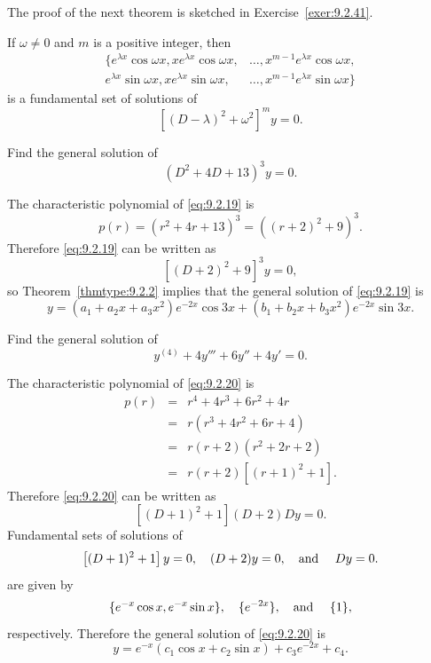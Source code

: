 The proof of the next theorem is sketched in Exercise~\ref{exer:9.2.41}.

\begin{theorem}
  \color{blue}
  \label{thmtype:9.2.2} If $\omega\ne0$ and $m$ is a positive integer, then
  \[
    \begin{array}{rl}
      \{e^{\lambda x}\cos\omega x,xe^{\lambda x}\cos\omega x, & \dots,x^{m-1}e^{\lambda x}\cos\omega x,  \\
      e^{\lambda x}\sin\omega x,xe^{\lambda x}\sin\omega x,   & \dots,x^{m-1}e^{\lambda x}\sin\omega x\}
    \end{array}
  \]
  is a fundamental set of solutions of
  \[
    [(D-\lambda)^{2}+\omega^{2}]^{m}y=0.
  \]
\end{theorem}

\begin{example}
  \label{example:9.2.6} \rm Find the general solution of
  \begin{equation}
    \label{eq:9.2.19}(D^{2}+4D+13)^{3}y=0.
  \end{equation}
\end{example}

\begin{examplesolution}
\solution The characteristic polynomial of \eqref{eq:9.2.19} is
\[
  p(r)=(r^{2}+4r+13)^{3}=\left((r+2)^{2}+9\right)^{3}.
\]
Therefore \eqref{eq:9.2.19} can be written as
\[
  [(D+2)^{2}+9]^{3}y=0,
\]
so Theorem~\ref{thmtype:9.2.2} implies that the general solution of \eqref{eq:9.2.19} is
\[
  y=(a_{1}+a_{2}x+a_{3}x^{2})e^{-2x}\cos3x +(b_{1}+b_{2}x+b_{3}x^{2})e^{-2x}\sin3x.
\]
\end{examplesolution}

\begin{example}
  \label{example:9.2.7} \rm Find the general solution of
  \begin{equation}
    \label{eq:9.2.20}y^{(4)}+4y'''+6y''+4y'=0.
  \end{equation}
\end{example}

\begin{examplesolution}
\solution The characteristic polynomial of \eqref{eq:9.2.20} is
\begin{eqnarray*}
  p(r) & = & r^{4}+4r^{3}+6r^{2}+4r \\
       & = & r(r^{3}+4r^{2}+6r+4)   \\
       & = & r(r+2)(r^{2}+2r+2)     \\
       & = & r(r+2)[(r+1)^{2}+1].
\end{eqnarray*}
Therefore \eqref{eq:9.2.20} can be written as
\[
  [(D+1)^{2}+1](D+2)Dy=0.
\]
Fundamental sets of solutions of
\[
  \left[(D+1)^{2}+1\right]y=0,\quad(D+2)y=0,\mbox{\quad and \quad}Dy=0.
\]
are given by
\[
  \{e^{-x}\cos x,e^{-x}\sin x\},\quad\{e^{-2x}\},\mbox{\quad and \quad}\{1\},
\]
respectively. Therefore the general solution of \eqref{eq:9.2.20} is
\[
  y=e^{-x}(c_{1}\cos x+c_{2}\sin x)+c_{3}e^{-2x}+c_{4}.
\]
\end{examplesolution}

